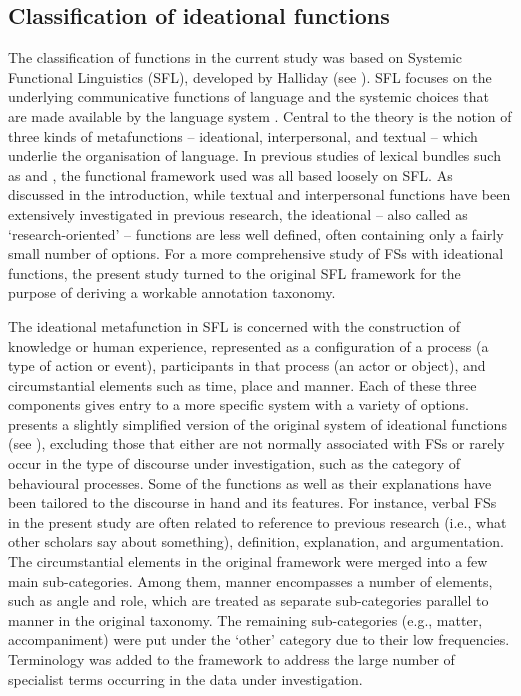 \documentclass[output=paper]{langsci/langscibook}
\begin{document}
\subsection{Classification of ideational functions}

The classification of functions in the current study was based on Systemic Functional Linguistics (SFL), developed by Halliday (see \citealt{Halliday2014}). SFL focuses on the underlying communicative functions of language and the systemic choices that are made available by the language system \citep{Gledhill2011}. Central to the theory is the notion of three kinds of metafunctions – ideational, interpersonal, and textual – which underlie the organisation of language. In previous studies of lexical bundles such as \citet{Hyland2008} and \citet{BiberEtAl2004}, the functional framework used was all based loosely on SFL. As discussed in the introduction, while textual and interpersonal functions have been extensively investigated in previous research, the ideational – also called as ‘research-oriented’ – functions are less well defined, often containing only a fairly small number of options. For a more comprehensive study of FSs with ideational functions, the present study turned to the original SFL framework for the purpose of deriving a workable annotation taxonomy.

The ideational metafunction in SFL is concerned with the construction of knowledge or human experience, represented as a configuration of a process (a type of action or event), participants in that process (an actor or object), and circumstantial elements such as time, place and manner. Each of these three components gives entry to a more specific system with a variety of options.  presents a slightly simplified version of the original system of ideational functions (see \citealt{Halliday2014}), excluding those that either are not normally associated with FSs or rarely occur in the type of discourse under investigation, such as the category of behavioural processes. Some of the functions as well as their explanations have been tailored to the discourse in hand and its features. For instance, verbal FSs in the present study are often related to reference to previous research (i.e., what other scholars say about something), definition, explanation, and argumentation. The circumstantial elements in the original framework were merged into a few main sub-categories. Among them, manner encompasses a number of elements, such as angle and role, which are treated as separate sub-categories parallel to manner in the original taxonomy. The remaining sub-categories (e.g., matter, accompaniment) were put under the ‘other’ category due to their low frequencies. Terminology was added to the framework to address the large number of specialist terms occurring in the data under investigation.
\end{document}
